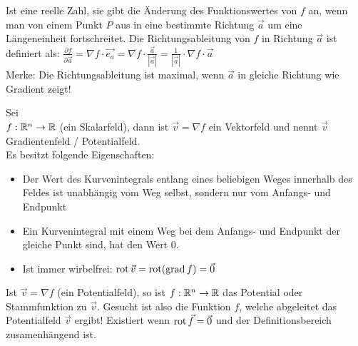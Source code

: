 \begin{definition}[Richtungsableitung]
Ist eine reelle Zahl, sie gibt die Änderung des Funktionswertes von $f$ an, wenn man von einem Punkt $P$ aus in eine bestimmte Richtung $\vec{a}$ um eine Längeneinheit fortschreitet. Die Richtungsableitung von $f$ in Richtung $\vec{a}$ ist definiert als: 
$\frac{\partial f}{\partial \vec{a}} = \nabla f \cdot \vec{e_a} = \nabla f \cdot \frac{\vec{a}}{|\vec{a}|} = \frac{1}{|\vec{a}|} \cdot \nabla f \cdot \vec{a}$\\
Merke: Die Richtungsableitung ist maximal, wenn $\vec{a}$ in gleiche Richtung wie Gradient zeigt!
\end{definition}

\begin{definition} Sei\\ 
$f: \mathbb{R}^n \to \mathbb{R}$ (ein Skalarfeld), dann ist $\vec{v} = \nabla f$ ein Vektorfeld und nennt $\vec{v}$
Gradientenfeld / Potentialfeld.\\
Es besitzt folgende Eigenschaften:
\begin{itemize}[leftmargin=0.5cm]
	\item Der Wert des Kurvenintegrals entlang eines beliebigen Weges innerhalb des
	Feldes ist unabhängig vom Weg selbst, sondern nur vom Anfangs- und Endpunkt
	\item Ein Kurvenintegral mit einem Weg bei dem Anfangs- und Endpunkt der
	gleiche Punkt sind, hat den Wert 0.
	\item Ist immer wirbelfrei: $\operatorname{rot} \vec{v} = \operatorname{rot}(\operatorname{grad} f) = \vec{0}$
\end{itemize}
\end{definition}

\begin{definition}[Potential]
Ist $\vec{v} = \nabla f$ (ein Potentialfeld), so ist $f: \mathbb{R}^n \to \mathbb{R}$ das Potential oder Stammfunktion zu $\vec{v}$. Gesucht ist also die Funktion $f$, welche abgeleitet das Potentialfeld $\vec{v}$ ergibt!
Existiert wenn $\operatorname{rot} \vec{f} = \vec{0}$ und der Definitionsbereich zusamenhängend ist.
\end{definition}

